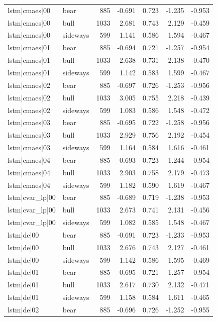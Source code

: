 \begin{table}
\begin{tabular}{llrrrrr}
lstm|cmaes|00 & bear & 885 & -0.691 & 0.723 & -1.235 & -0.953 \\
lstm|cmaes|00 & bull & 1033 & 2.681 & 0.743 & 2.129 & -0.459 \\
lstm|cmaes|00 & sideways & 599 & 1.141 & 0.586 & 1.594 & -0.467 \\
lstm|cmaes|01 & bear & 885 & -0.694 & 0.721 & -1.257 & -0.954 \\
lstm|cmaes|01 & bull & 1033 & 2.638 & 0.731 & 2.138 & -0.470 \\
lstm|cmaes|01 & sideways & 599 & 1.142 & 0.583 & 1.599 & -0.467 \\
lstm|cmaes|02 & bear & 885 & -0.697 & 0.726 & -1.253 & -0.956 \\
lstm|cmaes|02 & bull & 1033 & 3.005 & 0.755 & 2.218 & -0.439 \\
lstm|cmaes|02 & sideways & 599 & 1.083 & 0.586 & 1.548 & -0.472 \\
lstm|cmaes|03 & bear & 885 & -0.695 & 0.722 & -1.258 & -0.956 \\
lstm|cmaes|03 & bull & 1033 & 2.929 & 0.756 & 2.192 & -0.454 \\
lstm|cmaes|03 & sideways & 599 & 1.164 & 0.584 & 1.616 & -0.461 \\
lstm|cmaes|04 & bear & 885 & -0.693 & 0.723 & -1.244 & -0.954 \\
lstm|cmaes|04 & bull & 1033 & 2.903 & 0.758 & 2.179 & -0.473 \\
lstm|cmaes|04 & sideways & 599 & 1.182 & 0.590 & 1.619 & -0.467 \\
lstm|cvar\_lp|00 & bear & 885 & -0.689 & 0.719 & -1.238 & -0.953 \\
lstm|cvar\_lp|00 & bull & 1033 & 2.673 & 0.741 & 2.131 & -0.456 \\
lstm|cvar\_lp|00 & sideways & 599 & 1.082 & 0.585 & 1.548 & -0.467 \\
lstm|de|00 & bear & 885 & -0.691 & 0.723 & -1.233 & -0.953 \\
lstm|de|00 & bull & 1033 & 2.676 & 0.743 & 2.127 & -0.461 \\
lstm|de|00 & sideways & 599 & 1.142 & 0.586 & 1.595 & -0.469 \\
lstm|de|01 & bear & 885 & -0.695 & 0.721 & -1.257 & -0.954 \\
lstm|de|01 & bull & 1033 & 2.617 & 0.730 & 2.132 & -0.471 \\
lstm|de|01 & sideways & 599 & 1.158 & 0.584 & 1.611 & -0.465 \\
lstm|de|02 & bear & 885 & -0.696 & 0.726 & -1.252 & -0.955 \\

\end{tabular}
\end{table}
